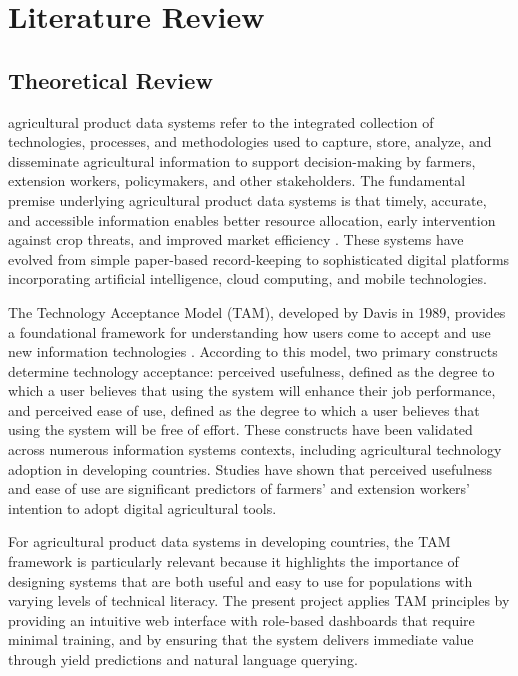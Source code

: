 
\chapter{Literature Review}

\section{Theoretical Review}

agricultural product data systems refer to the integrated collection of technologies, processes, and methodologies used to capture, store, analyze, and disseminate agricultural information to support decision-making by farmers, extension workers, policymakers, and other stakeholders. The fundamental premise underlying agricultural product data systems is that timely, accurate, and accessible information enables better resource allocation, early intervention against crop threats, and improved market efficiency \cite{fao2023}. These systems have evolved from simple paper-based record-keeping to sophisticated digital platforms incorporating artificial intelligence, cloud computing, and mobile technologies.

The Technology Acceptance Model (TAM), developed by Davis in 1989, provides a foundational framework for understanding how users come to accept and use new information technologies \cite{davis1989}. According to this model, two primary constructs determine technology acceptance: perceived usefulness, defined as the degree to which a user believes that using the system will enhance their job performance, and perceived ease of use, defined as the degree to which a user believes that using the system will be free of effort. These constructs have been validated across numerous information systems contexts, including agricultural technology adoption in developing countries. Studies have shown that perceived usefulness and ease of use are significant predictors of farmers' and extension workers' intention to adopt digital agricultural tools.

For agricultural product data systems in developing countries, the TAM framework is particularly relevant because it highlights the importance of designing systems that are both useful and easy to use for populations with varying levels of technical literacy. The present project applies TAM principles by providing an intuitive web interface with role-based dashboards that require minimal training, and by ensuring that the system delivers immediate value through yield predictions and natural language querying.

